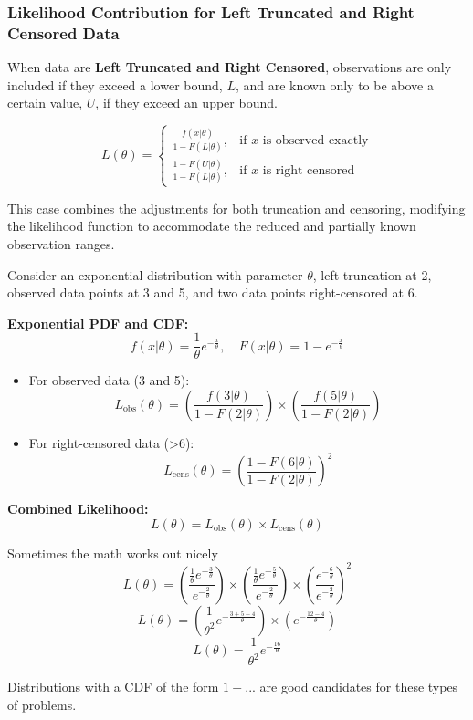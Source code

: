 \documentclass[compress,mathserif]{beamer}
\begin{document}
\begin{frame}
\frametitle{Likelihood Contribution for Left Truncated and Right Censored Data}

When data are \textbf{Left Truncated and Right Censored}, observations are only included if they exceed a lower bound, \(L\), and are known only to be above a certain value, \(U\), if they exceed an upper bound.

\[
L(\theta) = \left\{
  \begin{array}{ll}
  \frac{f(x|\theta)}{1 - F(L|\theta)}, & \text{if } x \text{ is observed exactly} \\
  \frac{1 - F(U|\theta)}{1 - F(L|\theta)}, & \text{if } x \text{ is right censored}
  \end{array}
\right.
\]

This case combines the adjustments for both truncation and censoring, modifying the likelihood function to accommodate the reduced and partially known observation ranges.

\end{frame}

\begin{frame}

Consider an exponential distribution with parameter \(\theta\), left truncation at 2, observed data points at 3 and 5, and two data points right-censored at 6.

\textbf{Exponential PDF and CDF:}
\[
f(x|\theta) = \frac{1}{\theta}e^{-\frac{x}{\theta}}, \quad F(x|\theta) = 1 - e^{-\frac{x}{\theta}}
\]


\begin{itemize}
    \item For observed data (3 and 5):
    \[
    L_{\text{obs}}(\theta) = \left(\frac{f(3|\theta)}{1-F(2|\theta)}\right) \times \left(\frac{f(5|\theta)}{1-F(2|\theta)}\right)
    \]
    
    \item For right-censored data (>6):
    \[
    L_{\text{cens}}(\theta) = \left(\frac{1 - F(6|\theta)}{1-F(2|\theta)}\right)^2
    \]
\end{itemize}

\textbf{Combined Likelihood:}
\[
L(\theta) = L_{\text{obs}}(\theta) \times L_{\text{cens}}(\theta)
\]


\end{frame}

\begin{frame}

Sometimes the math works out nicely
\[
L(\theta) = \left(\frac{\frac{1}{\theta}e^{-\frac{3}{\theta}}}{e^{-\frac{2}{\theta}}}\right) \times \left(\frac{\frac{1}{\theta}e^{-\frac{5}{\theta}}}{e^{-\frac{2}{\theta}}}\right) \times \left(\frac{e^{-\frac{6}{\theta}}}{e^{-\frac{2}{\theta}}}\right)^2
\]
\[
L(\theta) = \left(\frac{1}{\theta^2}e^{-\frac{3+5-4}{\theta}}\right) \times \left(e^{-\frac{12-4}{\theta}}\right)
\]
\[
L(\theta) = \frac{1}{\theta^2}e^{-\frac{16}{\theta}}
\]

Distributions with a CDF of the form $1 - ...$ are good candidates for these types of problems. 
\end{frame}
\end{document}
